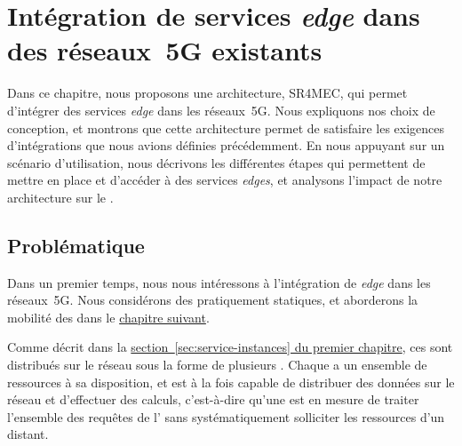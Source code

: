 \documentclass[../main.tex]{subfiles}
\begin{document}
\initSubfile[3]
\chapter{Intégration de services \textit{edge} dans des réseaux~5G existants}
\label{ch:edge-services-integration}
\begin{chapterHeader}
Dans ce chapitre, nous proposons une architecture, SR4MEC, qui permet d’intégrer des services \textit{edge} dans les réseaux~5G.
Nous expliquons nos choix de conception, et montrons que cette architecture permet de satisfaire les exigences d’intégrations que nous avions définies précédemment.
En nous appuyant sur un scénario d’utilisation, nous décrivons les différentes étapes qui permettent de mettre en place et d’accéder à des services \textit{edges}, et analysons l’impact de notre architecture sur le .
\end{chapterHeader}

\section{Problématique}
Dans un premier temps, nous nous intéressons à l’intégration de  \textit{edge} dans les réseaux~5G.
Nous considérons des  pratiquement statiques, et aborderons la mobilité des  dans le \hyperref[ch:mobility]{chapitre suivant}.

Comme décrit dans la \hyperref[sec:service-instances]{section~\ref*{sec:service-instances} du premier chapitre}, ces  sont distribués sur le réseau sous la forme de plusieurs .
Chaque  a un ensemble de ressources à sa disposition, et est à la fois capable de distribuer des données sur le réseau et d’effectuer des calculs, c’est-à-dire qu’une  est en mesure de traiter l’ensemble des requêtes de l’ sans systématiquement solliciter les ressources d’un  distant.
\end{document}
